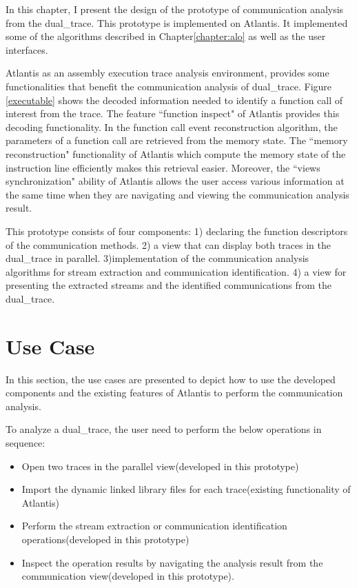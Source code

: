 

\label{chapter:newsol}
In this chapter, I present the design of the prototype of communication analysis from the dual\_trace. This prototype is implemented on Atlantis. It implemented some of the algorithms described in Chapter\ref{chapter:alo} as well as the user interfaces.

Atlantis as an assembly execution trace analysis environment, provides some functionalities that benefit the communication analysis of dual\_trace. Figure \ref{executable} shows the decoded information needed to identify a function call of interest from the trace. The feature ``function inspect" of Atlantis provides this decoding functionality. In the function call event reconstruction algorithm, the parameters of a function call are retrieved from the memory state. The ``memory reconstruction" functionality of Atlantis which compute the memory state of the instruction line efficiently makes this retrieval easier. Moreover, the ``views synchronization" ability of Atlantis allows the user access various information at the same time when they are navigating and viewing the communication analysis result.

This prototype consists of four components: 1) declaring the function descriptors of the communication methods. 2) a view that can display both traces in the dual\_trace in parallel. 3)implementation of the communication analysis algorithms for stream extraction and communication identification. 4) a view for presenting the extracted streams and the identified communications from the dual\_trace.

\section{Use Case}
In this section, the use cases are presented to depict how to use the developed components and the existing features of Atlantis to perform the communication analysis.

To analyze a dual\_trace, the user need to perform the below operations in sequence:
\begin{itemize}
\item Open two traces in the parallel view(developed in this prototype)
\item Import the dynamic linked library files for each trace(existing functionality of Atlantis)
\item Perform the stream extraction or communication identification operations(developed in this prototype)
\item Inspect the operation results by navigating the analysis result from the communication view(developed in this prototype).
\end{itemize}

